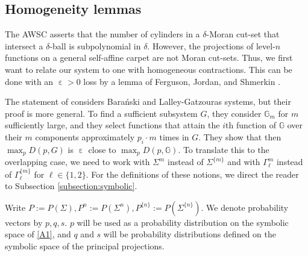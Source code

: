 \documentclass[a4paper, 11pt]{article}
\DeclareMathOperator{\eps}{\varepsilon}
\numberwithin{equation}{section}
\theoremstyle{plain}
\theoremstyle{remark}
\theoremstyle{definition}
\begin{document}

\subsection{Homogeneity lemmas}

The AWSC asserts that the number of cylinders in a $\delta$-Moran cut-set that intersect a $\delta$-ball is subpolynomial in $\delta$. However, the projections of level-$n$ functions on a general self-affine carpet are not Moran cut-sets. Thus, we first want to relate our system to one with homogeneous contractions. This can be done with an $\eps > 0$ loss by a lemma of Ferguson, Jordan, and Shmerkin \cite{ferguson2009hausdorffdimensionprojectionsselfaffine}.

The statement of \cite[Lemma 4.3]{ferguson2009hausdorffdimensionprojectionsselfaffine} considers Bara\'nski and Lalley-Gatzouras systems, but their proof is more general. To find a sufficient subsystem $G$, they consider $\mathbb{G}_m$ for $m$ sufficiently large, and they select functions that attain the $i$th function of $\mathbb{G}$ over their $m$ components approximately $p_i \cdot m$ times in $G$. They show that then $\max_pD(p,G)$ is $\eps$ close to $\max_pD(p,\mathbb{G})$. To translate this to the overlapping case, we need to work with $\Sigma^m$ instead of $\Sigma^{\{m\}}$ and with $\Gamma^m_\ell$ instead of $\Gamma^{\{m\}}_\ell$ for $\ell \in \{1,2\}$. For the definitions of these notions, we direct the reader to Subsection \ref{subsection:symbolic}. 

Write $P:=P(\Sigma), P^n:=P(\Sigma^n), P^{\{n\}}:=P(\Sigma^{\{n\}})$.
We denote probability vectors by $p,q,s$. $p$ will be used as a probability distribution on the symbolic space of \ref{A1}, and $q$ and $s$ will be probability distributions defined on the symbolic space of the principal projections.
\end{document}
